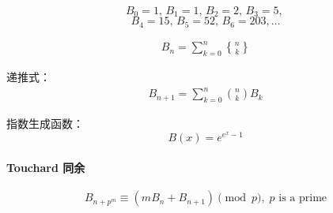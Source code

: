 $$B_0 = 1,\, B_1 = 1,\, B_2 = 2,\, B_3 = 5,\,$$
$$B_4 = 15,\, B_5 = 52,\, B_6 = 203, \dots$$

$$\begin{aligned}B_n = \sum_{k = 0} ^ n {n\brace k}\end{aligned}$$

递推式：
$$\begin{aligned}
B_{n + 1} = \sum_{k = 0} ^n {n\choose k} B_k
\end{aligned}$$

指数生成函数：$$B(x) = e^{e^x - 1}$$

\paragraph{Touchard 同余}
$$B_{n + p^m} \equiv (m B_n + B_{n + 1}) \pmod p,\;p \text{ is a prime}$$
